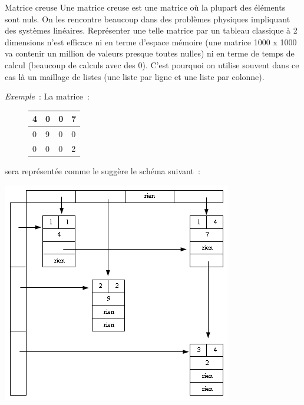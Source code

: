 	\begin{Exercice}{Matrice creuse}
		Une matrice creuse est une matrice où la plupart des éléments sont nuls. 
		On les rencontre beaucoup dans des problèmes
		physiques impliquant des systèmes linéaires. Représenter une telle 
		matrice par un tableau classique à 2 dimensions
		n'est efficace ni en terme d'espace mémoire (une matrice 
		1000 \textsf{x} 1000 va contenir un million de valeurs presque
		toutes nulles) ni en terme de temps de calcul (beaucoup de calculs 
		avec des 0). C'est pourquoi on utilise souvent dans
		ce cas là un maillage de listes (une liste par ligne et une liste 
		par colonne).

		\textit{Exemple}~: La matrice~:

		\begin{figure}
			\centering
			\begin{minipage}{2.388cm}
			\begin{flushleft}
			\tablefirsthead{}
			\tablehead{}
			\tabletail{}
			\tablelasttail{}
			\begin{supertabular}{|m{0.393cm}|m{0.393cm}|m{0.393cm}|m{0.41000003cm}|}
			\hline
			{ 4} &
			{ 0} &
			{ 0} &
			{ 7}\\
			\hline
			{ 0} &
			{ 9} &
			{ 0} &
			{ 0}\\
			\hline
			{ 0} &
			{ 0} &
			{ 0} &
			{ 2}\\
			\hline
			\end{supertabular}
			\end{flushleft}
			\end{minipage}
		\end{figure}
		
		\bigskip
		
		\bigskip
		
		\bigskip
		
		sera représentée comme le suggère le schéma suivant~:

		\begin{center}
		\includegraphics[width=10.028cm,height=9.657cm]{image/a2012Logique2eme-img010.png}
		\end{center}
		

\end{Exercice}
